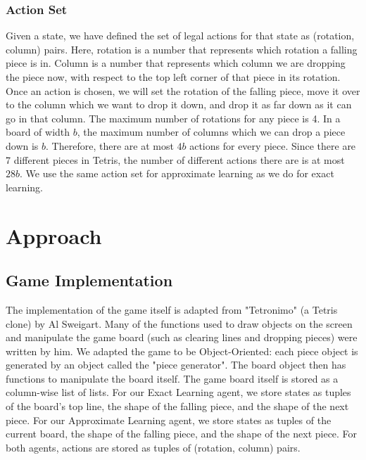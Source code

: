 \documentclass[11pt]{article}
\begin{document}
\subsubsection{Action Set}
Given a state, we have defined the set of legal actions for that state as (rotation, column) pairs. Here, rotation is a number that represents which rotation a falling piece is in. Column is a number that represents which column we are dropping the piece now, with respect to the top left corner of that piece in its rotation. Once an action is chosen, we will set the rotation of the falling piece, move it over to the column which we want to drop it down, and drop it as far down as it can go in that column. The maximum number of rotations for any piece is 4. In a board of width $b$, the maximum number of columns which we can drop a piece down is  $b$. Therefore, there are at most $4b$ actions for every piece. Since there are 7 different pieces in Tetris, the number of different actions there are is at most $28b$. We use the same action set for approximate learning as we do for exact learning.

\section{Approach}

\subsection{Game Implementation}
The implementation of the game itself is adapted from "Tetronimo" (a Tetris clone) by Al Sweigart. Many of the functions used to draw objects on the screen and manipulate the game board (such as clearing lines and dropping pieces) were written by him\cite{WEBSITE:1}. We adapted the game to be Object-Oriented: each piece object is generated by an object called the "piece generator". The board object then has functions to manipulate the board itself. The game board itself is stored as a column-wise list of lists. For our Exact Learning agent, we store states as tuples of the board's top line, the shape of the falling piece, and the shape of the next piece. For our Approximate Learning agent, we store states as tuples of the current board, the shape of the falling piece, and the shape of the next piece. For both agents, actions are stored as tuples of (rotation, column) pairs.
\end{document}
